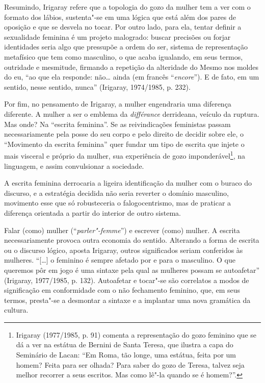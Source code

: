 Resumindo, Irigaray refere que a topologia do gozo da mulher tem a ver
com o formato dos lábios, sustenta"-se em uma lógica que está além dos
pares de oposição e que se desvela no tocar. Por outro lado, para ela,
tentar definir a sexualidade feminina é um projeto malogrado: buscar
precisões ou forjar identidades seria algo que pressupõe a ordem do ser,
sistema de representação metafísico que tem como masculino, o que acaba
igualando, em seus termos, outridade e mesmitude, firmando a repetição
da alteridade do Mesmo nos moldes do eu, ``ao que ela responde: não\ldots{}
ainda (em francês ``\emph{encore}''). E de fato, em um sentido, nesse
sentido, nunca'' (Irigaray, 1974/1985, p. 232).

Por fim, no pensamento de Irigaray, a mulher engendraria uma diferença
diferente. A mulher a ser o emblema da \emph{différance} derrideana,
veículo da ruptura. Mas onde? Na ``escrita feminina''. Se as
reivindicações feministas passam necessariamente pela posse do seu corpo
e pelo direito de decidir sobre ele, o ``Movimento da escrita feminina''
quer fundar um tipo de escrita que injete o mais visceral e próprio da
mulher, sua experiência de gozo imponderável\footnote{Irigaray
  (1977/1985, p. 91) comenta a representação do gozo feminino que se dá
  a ver na estátua de Bernini de Santa Teresa, que ilustra a capa do
  Seminário  de Lacan: ``Em Roma, tão longe, uma estátua, feita por um
  homem? Feita para ser olhada? Para saber do gozo de Teresa, talvez
  seja melhor recorrer a seus escritos. Mas como lê"-la quando se é
  homem?''.}, na linguagem, e assim convulsionar a sociedade.

A escrita feminina derrocaria a ligeira identificação da mulher com o
buraco do discurso, e a estratégia decidida não seria reverter o domínio
masculino, movimento esse que só robusteceria o falogocentrismo, mas de
praticar a diferença orientada a partir do interior de outro sistema.

Falar (como) mulher (``\emph{parler"-femme}'') e escrever (como) mulher.
A escrita necessariamente provoca outra economia do sentido. Alterando a
forma de escrita ou o discurso lógico, aposta Irigaray, outros
significados seriam conferidos às mulheres. ``{[}\ldots{}{]} o feminino é
sempre afetado por e para o masculino. O que queremos pôr em jogo é uma
sintaxe pela qual as mulheres possam se autoafetar'' (Irigaray,
1977/1985, p. 132). Autoafetar e tocar"-se são correlatos a modos de
significação em conformidade com o não fechamento feminino, que, em seus
termos, presta"-se a desmontar a sintaxe e a implantar uma nova gramática
da cultura.

